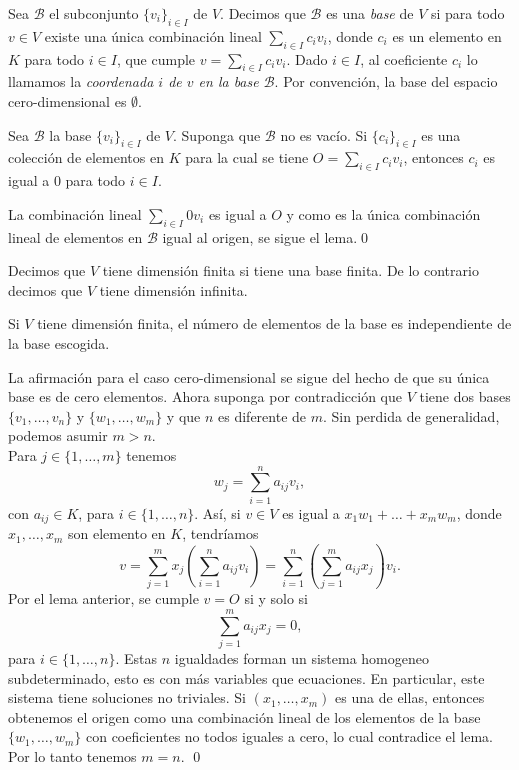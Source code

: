 \begin{defn}
Sea $\mathcal{B}$ el subconjunto $\{v_i\}_{i\in I}$ de $V$. Decimos que $\mathcal{B}$ es una \emph{base} de $V$ si para todo $v\in V$ existe una \'unica combinaci\'on lineal $\sum_{i\in I} c_iv_i$, donde $c_i$ es un elemento en $K$ para todo $i\in I$, que cumple $v=\sum_{i\in I} c_iv_i$. Dado $i\in I$, al coeficiente $c_i$ lo llamamos la \emph{coordenada $i$ de $v$ en la base $\mathcal{B}$}. Por convenci\'on, la base del espacio cero-dimensional es  $\emptyset$. 
\end{defn}

\begin{lema}\label{lemabas}
Sea $\mathcal{B}$ la base $\{v_i\}_{i\in I}$ de $V$. Suponga que $\mathcal{B}$ no es vac\'io. Si $\{c_i\}_{i\in I}$ es una colecci\'on de elementos en $K$ para la cual se tiene $O=\sum_{i\in I}c_iv_i$, entonces $c_i$ es igual a $0$ para todo $i\in I$.
\end{lema}

\dem La combinaci\'on lineal $\sum_{i\in I}0v_i$ es igual a $O$ y como es la \'unica combinaci\'on lineal de elementos en $\mathcal{B}$  igual al origen, se sigue el lema.\qed 


\begin{defn}
Decimos que $V$ tiene dimensi\'on finita si tiene una base finita. De lo contrario decimos que $V$ tiene dimensi\'on infinita.
\end{defn}

\begin{teo} \label{basedim}
Si $V$ tiene dimensi\'on finita, el n\'umero de elementos de la base es independiente de la base escogida.
\end{teo}

\dem La afirmaci\'on para el caso cero-dimensional se sigue del hecho de que su \'unica base es de cero elementos. Ahora suponga por contradicci\'on que $V$ tiene dos bases $\{v_1,\ldots, v_n\}$ y $\{w_1,\ldots, w_m\}$ y que $n$ es diferente de $m$. Sin perdida de generalidad, podemos asumir $m>n$.\\
Para $j\in\{1,\ldots,m\}$ tenemos $$w_j=\sum_{i=1}^n a_{ij}v_i,$$ con $a_{ij}\in K$, para $i\in\{1,\ldots,n\}$. As\'i, si $v\in V$ es igual a $x_1w_1+\ldots+x_mw_m$, donde $x_1,\ldots,x_m$ son elemento en $K$, tendr\'iamos
$$v = \sum_{j=1}^m x_j\left(\sum_{i=1}^n a_{ij}v_i\right) = \sum_{i=1}^n\left(\sum_{j=1}^m a_{ij}x_j\right)v_i.$$
Por el lema anterior, se cumple $v=O$ si y solo si
\[
\sum_{j=1}^m a_{ij}x_j=0,
\]
para $i\in\{1,\ldots,n\}$. Estas $n$ igualdades forman un sistema homogeneo subdeterminado, esto es con m\'as variables que ecuaciones. En particular, este sistema tiene soluciones no triviales. Si $(x_1,\ldots,x_m)$ es una de ellas, entonces obtenemos el origen como una combinaci\'on lineal de los elementos de la base $\{w_1,\ldots, w_m\}$ con coeficientes no todos iguales a cero, lo cual contradice el lema. Por lo tanto tenemos $m=n$. \qed

